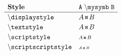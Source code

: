 \documentclass[varwidth, border = 3pt]{standalone}
\newcommand{\test}%
           {A \mysymb B}
\newcommand{\verbtest}%
           {A \mathmacro{mysymb} B}
\newcommand{\testmathstyle}{
    \[
        \renewcommand{\arraystretch}{1.2}%
        \begin{array}{lll}
              \textbf{Style}
            & \mathtt{\verbtest}
            \\ \hline
              \mathtt{\backslash displaystyle}
            & \displaystyle \test
            \\
              \mathtt{\backslash textstyle}
            & \textstyle \test
            \\
              \mathtt{\backslash scriptstyle}
            & \scriptstyle \test
            \\
              \mathtt{\backslash scriptscriptstyle}
            & \scriptscriptstyle \test
        \end{array}
    \]
}
\begin{document}
\testmathstyle
\end{document}
